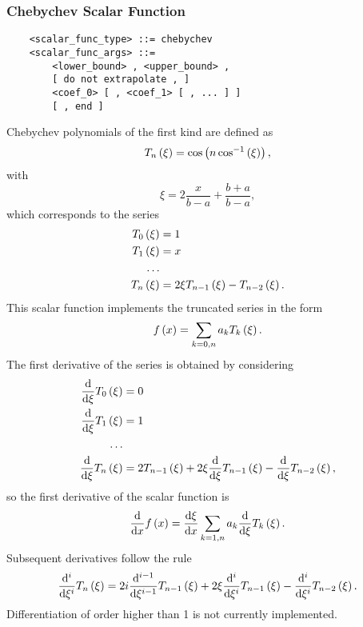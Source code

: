 \subsubsection{Chebychev Scalar Function}
\begin{verbatim}
    <scalar_func_type> ::= chebychev
    <scalar_func_args> ::= 
        <lower_bound> , <upper_bound> ,
        [ do not extrapolate , ]
        <coef_0> [ , <coef_1> [ , ... ] ]
        [ , end ]
\end{verbatim}
Chebychev polynomials of the first kind are defined as
\begin{equation}
	T_n\left( \xi \right) = \cos\left( n \cos^{-1}\left( \xi \right) \right) ,
\end{equation}
with
\begin{equation}
	\xi = 2 \frac{x}{b - a} + \frac{b + a}{b - a} ,
\end{equation}
which corresponds to the series
\begin{align}
	T_0\left( \xi \right) &= 1 \\
	T_1\left( \xi \right) &= x \\
	\ldots \nonumber \\
	T_n\left( \xi \right) &= 2 \xi T_{n-1}\left( \xi \right) - T_{n-2}\left( \xi \right) .
\end{align}
This scalar function implements the truncated series in the form
\begin{equation}
	f\left( x \right) = \sum_{k=0,n} a_k T_k\left( \xi \right) .
\end{equation}
The first derivative of the series is obtained by considering
\begin{align}
	\frac{\mathrm{d}}{\mathrm{d}\xi}T_0\left( \xi \right) &= 0 \\
	\frac{\mathrm{d}}{\mathrm{d}\xi}T_1\left( \xi \right) &= 1 \\
	\ldots \nonumber \\
	\frac{\mathrm{d}}{\mathrm{d}\xi}T_n\left( \xi \right) &= 
		2 T_{n-1}\left( \xi \right)
		+ 2 \xi \frac{\mathrm{d}}{\mathrm{d}\xi}T_{n-1}\left( \xi \right)
		- \frac{\mathrm{d}}{\mathrm{d}\xi}T_{n-2}\left( \xi \right) ,
\end{align}
so the first derivative of the scalar function is
\begin{equation}
	\frac{\mathrm{d}}{\mathrm{d}x}f\left( x \right) = \frac{\mathrm{d}\xi}{\mathrm{d}x} \sum_{k=1,n} a_k \frac{\mathrm{d}}{\mathrm{d}\xi} T_k\left( \xi \right) .
\end{equation}
Subsequent derivatives follow the rule
\begin{equation}
	\frac{\mathrm{d}^i}{\mathrm{d}\xi^i}T_n\left( \xi \right) = 
		2 i \frac{\mathrm{d}^{i-1}}{\mathrm{d}\xi^{i-1}}T_{n-1}\left( \xi \right)
		+ 2 \xi \frac{\mathrm{d}^i}{\mathrm{d}\xi^i}T_{n-1}\left( \xi \right)
		- \frac{\mathrm{d}^i}{\mathrm{d}\xi^i}T_{n-2}\left( \xi \right) .
\end{equation}
Differentiation of order higher than 1 is not currently implemented.




